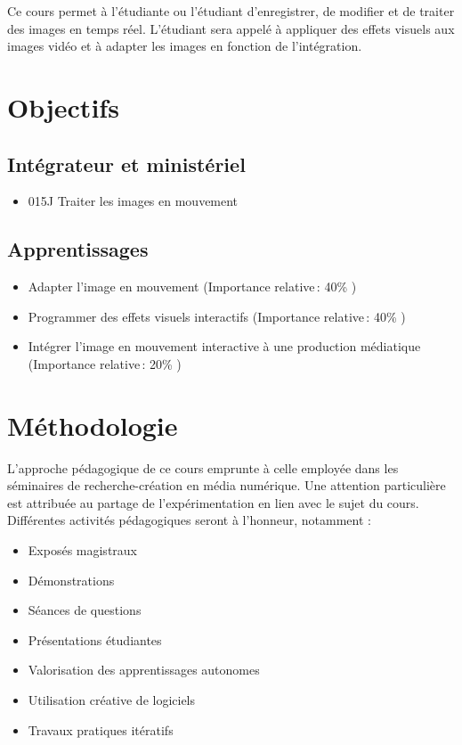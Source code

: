 \documentclass[
]{book}
\providecommand{\tightlist}{%
  \setlength{\itemsep}{0pt}\setlength{\parskip}{0pt}}
\begin{document}
Ce cours permet à l'étudiante ou l'étudiant d'enregistrer, de modifier et de traiter des images en temps réel.
L'étudiant sera appelé à appliquer des effets visuels aux images vidéo et à adapter les images en fonction de l'intégration.

\hypertarget{objectifs}{%
\section{Objectifs}\label{objectifs}}

\hypertarget{intuxe9grateur-et-ministuxe9riel}{%
\subsection{Intégrateur et ministériel}\label{intuxe9grateur-et-ministuxe9riel}}

\begin{itemize}
\tightlist
\item
  015J Traiter les images en mouvement
\end{itemize}

\hypertarget{apprentissages}{%
\subsection{Apprentissages}\label{apprentissages}}

\begin{itemize}
\tightlist
\item
  Adapter l'image en mouvement (Importance relative\,: 40\% )
\item
  Programmer des effets visuels interactifs (Importance relative\,: 40\% )
\item
  Intégrer l'image en mouvement interactive à une production médiatique (Importance relative\,: 20\% )
\end{itemize}

\hypertarget{muxe9thodologie}{%
\section{Méthodologie~}\label{muxe9thodologie}}

L'approche pédagogique de ce cours emprunte à celle employée dans les séminaires de recherche-création en média numérique. Une attention particulière est attribuée au partage de l'expérimentation en lien avec le sujet du cours. Différentes activités pédagogiques seront à l'honneur, notamment :

\begin{itemize}
\tightlist
\item
  Exposés magistraux
\item
  Démonstrations
\item
  Séances de questions
\item
  Présentations étudiantes
\item
  Valorisation des apprentissages autonomes
\item
  Utilisation créative de logiciels
\item
  Travaux pratiques itératifs
\end{itemize}
\end{document}
